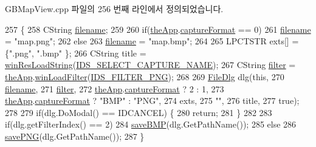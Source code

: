 G\+B\+Map\+View.\+cpp 파일의 256 번째 라인에서 정의되었습니다.


\begin{DoxyCode}
257 \{
258   CString \mbox{\hyperlink{_s_d_l_8cpp_ac33a174c39700095ca0f892624d85a3f}{filename}};
259 
260   \textcolor{keywordflow}{if}(\mbox{\hyperlink{_v_b_a_8cpp_a8095a9d06b37a7efe3723f3218ad8fb3}{theApp}}.\mbox{\hyperlink{class_v_b_a_a103f0b25433c57c4458a208a06799cf8}{captureFormat}} == 0)
261     \mbox{\hyperlink{_s_d_l_8cpp_ac33a174c39700095ca0f892624d85a3f}{filename}} = \textcolor{stringliteral}{"map.png"};
262   \textcolor{keywordflow}{else}
263     \mbox{\hyperlink{_s_d_l_8cpp_ac33a174c39700095ca0f892624d85a3f}{filename}} = \textcolor{stringliteral}{"map.bmp"};
264 
265   LPCTSTR exts[] = \{\textcolor{stringliteral}{".png"}, \textcolor{stringliteral}{".bmp"} \};
266   CString title = \mbox{\hyperlink{_win_res_util_8cpp_a416e85e80ab9b01376e87251c83d1a5a}{winResLoadString}}(\mbox{\hyperlink{resource_8h_a10c24c77703afe57f6e641e939997cd2}{IDS\_SELECT\_CAPTURE\_NAME}});
267   CString \mbox{\hyperlink{_s_d_l_8cpp_af0122ee4312107103b580a98c74a4ea6}{filter}} = \mbox{\hyperlink{_v_b_a_8cpp_a8095a9d06b37a7efe3723f3218ad8fb3}{theApp}}.\mbox{\hyperlink{class_v_b_a_a228edf26b0dc4129658c174ee5a3c27c}{winLoadFilter}}(\mbox{\hyperlink{resource_8h_a374944c3928d8197bc2bbf9e85207a4d}{IDS\_FILTER\_PNG}});
268 
269   \mbox{\hyperlink{class_file_dlg}{FileDlg}} dlg(\textcolor{keyword}{this},
270               \mbox{\hyperlink{_s_d_l_8cpp_ac33a174c39700095ca0f892624d85a3f}{filename}},
271               \mbox{\hyperlink{_s_d_l_8cpp_af0122ee4312107103b580a98c74a4ea6}{filter}},
272               \mbox{\hyperlink{_v_b_a_8cpp_a8095a9d06b37a7efe3723f3218ad8fb3}{theApp}}.\mbox{\hyperlink{class_v_b_a_a103f0b25433c57c4458a208a06799cf8}{captureFormat}} ? 2 : 1,
273               \mbox{\hyperlink{_v_b_a_8cpp_a8095a9d06b37a7efe3723f3218ad8fb3}{theApp}}.\mbox{\hyperlink{class_v_b_a_a103f0b25433c57c4458a208a06799cf8}{captureFormat}} ? \textcolor{stringliteral}{"BMP"} : \textcolor{stringliteral}{"PNG"},
274               exts,
275               \textcolor{stringliteral}{""},
276               title, 
277               \textcolor{keyword}{true});
278 
279   \textcolor{keywordflow}{if}(dlg.DoModal() == IDCANCEL) \{
280     \textcolor{keywordflow}{return};
281   \}
282 
283   \textcolor{keywordflow}{if}(dlg.getFilterIndex() == 2)
284     \mbox{\hyperlink{class_g_b_map_view_a90fcc5d761fb5dfdb8f61e405831f3b5}{saveBMP}}(dlg.GetPathName());
285   \textcolor{keywordflow}{else}
286     \mbox{\hyperlink{class_g_b_map_view_a18226efdae32cdcf93b2994d2c002a02}{savePNG}}(dlg.GetPathName());
287 \}
\end{DoxyCode}
